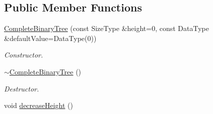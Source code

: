 \subsection*{Public Member Functions}
\begin{DoxyCompactItemize}
\item 
\hyperlink{class_complete_binary_tree_ab29b9b403e94cf4fa13ad62f09709540}{CompleteBinaryTree} (const SizeType \&height=0, const DataType \&defaultValue=DataType(0))
\begin{DoxyCompactList}\small\item\em Constructor. \item\end{DoxyCompactList}\item 
\hypertarget{class_complete_binary_tree_aa30d3bdf70bbe605eb1177d0117ca011}{
\hyperlink{class_complete_binary_tree_aa30d3bdf70bbe605eb1177d0117ca011}{$\sim$CompleteBinaryTree} ()}
\label{class_complete_binary_tree_aa30d3bdf70bbe605eb1177d0117ca011}

\begin{DoxyCompactList}\small\item\em Destructor. \item\end{DoxyCompactList}\item 
\hypertarget{class_complete_binary_tree_acbbf692497d6e4d4cb03ca9c81f74291}{
void \hyperlink{class_complete_binary_tree_acbbf692497d6e4d4cb03ca9c81f74291}{decreaseHeight} ()}
\label{class_complete_binary_tree_acbbf692497d6e4d4cb03ca9c81f74291}


\end{DoxyCompactItemize}
